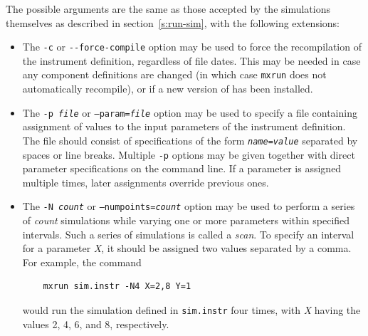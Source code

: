 The possible arguments are the same as those accepted by the simulations
themselves as described in section~\ref{s:run-sim}, with the following
extensions:
\begin{itemize}
\item The \verb+-c+ or \verb+--force-compile+ option may be used to force
  the recompilation of the instrument definition, regardless of file
  dates. This may be needed in case any component definitions are
  changed (in which case \verb+mxrun+ does not automatically recompile),
  or if a new version of \MCX  has been installed.
\item The \texttt{-p {\it file}} or \texttt{--param={\it file}} option
  may be used to specify a file containing assignment of values to the
  input parameters of the instrument definition. The file should consist
  of specifications of the form \texttt{{\it name\/}={\it value\/}}
  separated by spaces or line breaks. Multiple \verb+-p+ options may be
  given together with direct parameter specifications on the command
  line. If a parameter is assigned multiple times, later assignments
  override previous ones.
\item The \texttt{-N {\it count}} or \texttt{--numpoints={\it count}} option
  may be used to perform a series of \textit{count\/} simulations while
  varying one or more parameters within specified intervals. Such a
  series of simulations is called a \emph{scan}. To specify
  an interval for a parameter \textit{X}, it should be assigned two
  values separated by a comma. For example, the command
\begin{verbatim}
    mxrun sim.instr -N4 X=2,8 Y=1
\end{verbatim}
would run the simulation defined in \verb+sim.instr+ four times, with
\textit{X} having the values 2, 4, 6, and 8, respectively.


\end{itemize}
